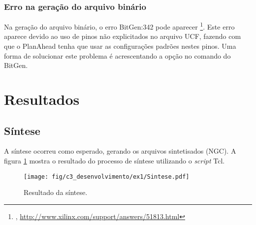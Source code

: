 \documentclass[11pt,a4paper,oneside]{book}
\begin{document}
\subsubsection{Erro na geração do arquivo binário}
Na geração do arquivo binário, o erro BitGen:342 pode aparecer \footnote{, \url{http://www.xilinx.com/support/answers/51813.html}}.
Este erro aparece devido ao uso de pinos não explicitados no arquivo UCF, fazendo com que o PlanAhead tenha que usar as configurações padrões nestes pinos.
Uma forma de solucionar este problema é acrescentando a opção  no comando do BitGen. 

\section{Resultados}
\subsection{Síntese}
A síntese ocorreu como esperado, gerando os arquivos sintetisados (NGC).
A figura \ref{fig:ex1:sintese} mostra o resultado do processo de síntese utilizando o \textit{script} Tcl.
\begin{figure}[h]
\centering
\texttt{[image: fig/c3\_desenvolvimento/ex1/Sintese.pdf]}
\caption{Resultado da síntese.}
\label{fig:ex1:sintese}
\end{figure}
\end{document}

